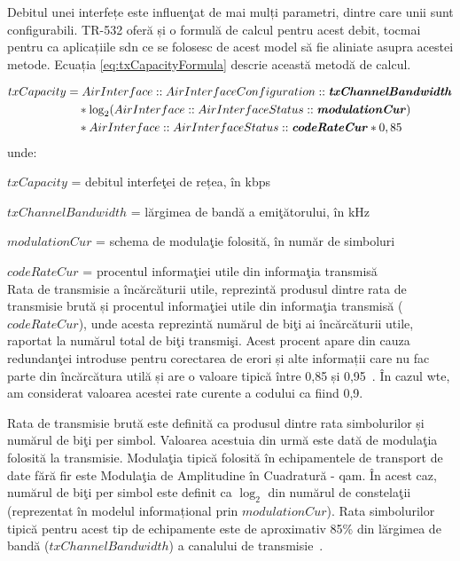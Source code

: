 Debitul unei interfețe este influenţat de mai mulți parametri, dintre care unii sunt configurabili. TR-532 oferă și o formulă de calcul pentru acest debit, tocmai pentru ca aplicațiile \gls{sdn} ce se folosesc de acest model să fie aliniate asupra acestei metode. Ecuația \ref{eq:txCapacityFormula} descrie această metodă de calcul.

\begin{equation}\label{eq:txCapacityFormula}
\begin{split}
txCapacity& =AirInterface::AirInterfaceConfiguration::\textbf{\textit{txChannelBandwidth}}\\
& \quad * \log_{2}(AirInterface::AirInterfaceStatus::\textbf{\textit{modulationCur}})\\
& \quad * AirInterface::AirInterfaceStatus::\textbf{\textit{codeRateCur}} * 0,85
\end{split}
\end{equation}
unde:

$txCapacity$ = debitul interfeţei de rețea, în kbps

$txChannelBandwidth$ = lărgimea de bandă a emiţătorului, în kHz

$modulationCur$ = schema de modulaţie folosită, în număr de simboluri

$codeRateCur$ = procentul informaţiei utile din informaţia transmisă\\

Rata de transmisie a încărcăturii utile, reprezintă produsul dintre rata de transmisie brută și procentul informaţiei utile din informaţia transmisă ($codeRateCur$), unde acesta reprezintă numărul de biţi ai încărcăturii utile, raportat la numărul total de biţi transmişi. Acest procent apare din cauza redundanţei introduse pentru corectarea de erori și alte informații care nu fac parte din încărcătura utilă și are o valoare tipică între 0,85 și 0,95~\cite{kizer2013digital}. În cazul \gls{wte}, am considerat valoarea acestei rate curente a codului ca fiind 0,9.

Rata de transmisie brută este definită ca produsul dintre rata simbolurilor și numărul de biţi per simbol. Valoarea acestuia din urmă este dată de modulaţia folosită la transmisie. Modulaţia tipică folosită în echipamentele de transport de date fără fir este Modulaţia de Amplitudine în Cuadratură - \gls{qam}. În acest caz, numărul de biţi per simbol este definit ca $\log_{2}$ din numărul de constelaţii (reprezentat în modelul informațional prin $modulationCur$). Rata simbolurilor tipică pentru acest tip de echipamente este de aproximativ 85\% din lărgimea de bandă ($txChannelBandwidth$) a canalului de transmisie~\cite{kizer2013digital}.

